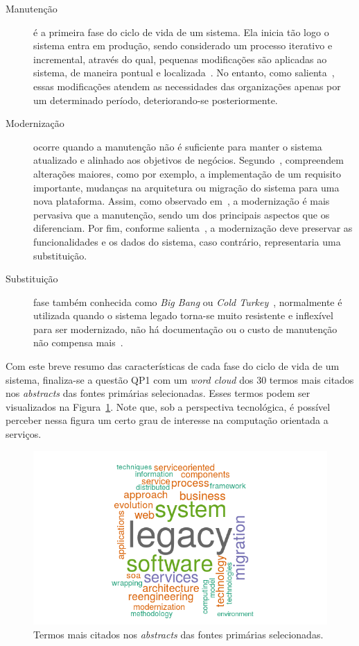 \begin{description}

\item[Manutenção] é a primeira fase do ciclo de vida de um sistema. Ela inicia tão logo o sistema entra em produção, 
sendo considerado um processo iterativo e incremental, através do qual, pequenas modificações são aplicadas ao sistema, 
de maneira pontual e localizada~\cite{S01_bennett2000software, S12_WeidermanApproaches:1997}. No entanto, como salienta~\cite{Seacord:2003}, 
essas modificações atendem as necessidades das organizações apenas por um determinado período, deteriorando-se posteriormente.

\item[Modernização] ocorre quando a manutenção não é suficiente para manter o sistema atualizado e alinhado aos objetivos de negócios. 
Segundo~\cite{S01_bennett2000software, S3_Bisbal:1999, S12_WeidermanApproaches:1997}, compreendem alterações maiores, como por exemplo, a implementação de um requisito importante, 
mudanças na arquitetura ou migração do sistema para uma nova plataforma. Assim, como observado em~\cite{S01_bennett2000software}, a modernização é mais pervasiva que a manutenção, 
sendo um dos principais aspectos que os diferenciam. Por fim, conforme salienta~\cite{Seacord:2003}, a modernização deve preservar as funcionalidades e os dados do sistema, caso contrário, 
representaria uma substituição. 

\item[Substituição] fase também conhecida como \textit{Big Bang} ou \textit{Cold Turkey}~\cite{Seacord:2003}, normalmente é utilizada quando o sistema 
legado torna-se muito resistente e inflexível para ser modernizado, não há documentação ou o custo de manutenção não compensa mais~\cite{S01_bennett2000software, S3_Bisbal:1999, S12_WeidermanApproaches:1997}.

\end{description}

Com este breve resumo das características de cada fase do ciclo de vida de um sistema, finaliza-se a questão QP1 com um \textit{word cloud} 
dos 30 termos mais citados nos \textit{abstracts} das fontes primárias selecionadas. Esses termos podem ser visualizados na 
Figura~\ref{fig:word_cloud}. Note que, sob a perspectiva tecnol\'{o}gica, \'{e} poss\'{i}vel perceber nessa figura um certo grau de 
interesse na computa\c c\~{a}o orientada a servi\c cos. 


\begin{figure}[ht]
\centering
\includegraphics[scale=0.40]{img/mapeamento/word_cloud.png}
\caption{Termos mais citados nos \textit{abstracts} das fontes primárias selecionadas.}
\label{fig:word_cloud}
\end{figure}

